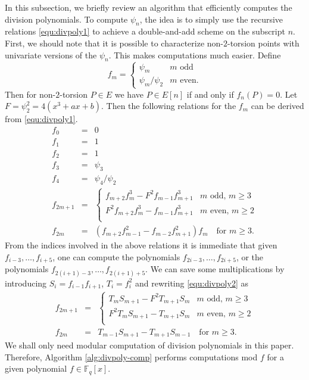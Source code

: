 \documentclass[12pt]{article}
\theoremstyle{plain}
\theoremstyle{definition}
\def\F{\ensuremath{\mathbb{F}}}
\begin{document}
In this subsection, we briefly review an algorithm that efficiently computes the division 
polynomials. To compute $\psi_n$, the idea is to simply use the recursive relations 
\eqref{equ:divpoly1} to achieve a double-and-add scheme on the subscript $n$. First, we should note 
that it is possible to characterize non-$2$-torsion points with univariate versions of the 
$\psi_n$. This makes computations much easier. Define
\[
f_m = 
\begin{cases}
	\psi_m & m \text{ odd} \\
	\psi_m / \psi_2 & m \text{ even}.
\end{cases}
\]
Then for non-$2$-torsion $P \in E$ we have $P \in E[n]$ if and only if $f_n(P) = 0$. Let $F = 
\psi_2^2 = 4(x^3 + ax + b)$. Then the following relations for the $f_m$ can be derived from 
\eqref{equ:divpoly1}.
\begin{equation}
\label{equ:divpoly2}
	\begin{array}{rll}
		f_0 & = & 0 \\
		f_1 & = & 1 \\
		f_2 & = & 1 \\
		f_3 & = & \psi_3 \\
		f_4 & = & \psi_4 / \psi_2 \\
		f_{2m + 1} & = & 
		\begin{cases}
			f_{m + 2}f_m^3 - F^2f_{m - 1}f_{m + 1}^3 & m \text{ odd, } m \ge 3 \\
			F^2f_{m + 2}f_m^3 - f_{m - 1}f_{m + 1}^3 & m \text{ even, } m \ge 2 \\
		\end{cases} \\
		f_{2m} & = & (f_{m + 2}f_{m - 1}^2 - f_{m - 2}f_{m + 1}^2)f_m \quad \text{for } m \ge 3.
	\end{array}
\end{equation}
From the indices involved in the above relations it is immediate that given $f_{i - 3}, \dots, f_{i 
+ 5}$, one can compute the polynomials $f_{2i - 3}, \dots, f_{2i + 5}$, or the polynomials $f_{2(i 
+ 1) - 3}, \dots, f_{2(i + 1) + 5}$. We can save some multiplications by introducing $S_i = f_{i - 
1}f_{i + 1}$, $T_i = f_i^2$ and rewriting \eqref{equ:divpoly2} as
\begin{equation}
\label{equ:divpoly3}
\begin{array}{rll}
	f_{2m + 1} & = & 
	\begin{cases}
		T_mS_{m + 1} - F^2T_{m + 1}S_m & m \text{ odd, } m \ge 3 \\
		F^2T_mS_{m + 1} - T_{m + 1}S_m & m \text{ even, } m \ge 2 \\
	\end{cases} \\
	f_{2m} & = & T_{m - 1}S_{m + 1} - T_{m + 1}S_{m - 1} \quad \text{for } m \ge 3.
\end{array}
\end{equation}
We shall only need modular computation of division polynomials in this paper. Therefore, Algorithm 
\ref{alg:divpoly-comp} performs computations mod $f$ for a given polynomial $f \in \F_q[x]$.
\end{document}
